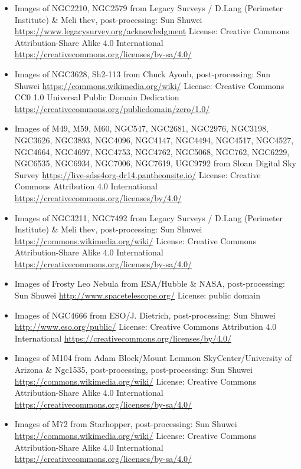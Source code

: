 \begin{itemize}
	 \url{http://eso.org/public/}
	 License: Creative Commons Attribution 4.0 International \url{https://creativecommons.org/licenses/by/4.0/}
\item Images of NGC2210, NGC2579
	 from Legacy Surveys / D.Lang (Perimeter Institute) \& Meli thev, post-processing: Sun Shuwei
	 \url{https://www.legacysurvey.org/acknowledgment}
	 License: Creative Commons Attribution-Share Alike 4.0 International \url{https://creativecommons.org/licenses/by-sa/4.0/}
\item Images of NGC3628, Sh2-113
	 from Chuck Ayoub, post-processing: Sun Shuwei
	 \url{https://commons.wikimedia.org/wiki/}
	 License: Creative Commons CC0 1.0 Universal Public Domain Dedication \url{https://creativecommons.org/publicdomain/zero/1.0/}
\item Images of M49, M59, M60, NGC547, NGC2681, NGC2976, NGC3198, NGC3626, NGC3893,
	 NGC4096, NGC4147, NGC4494, NGC4517, NGC4527, NGC4664, NGC4697, NGC4753,
	 NGC4762, NGC5068, NGC762, NGC6229, NGC6535, NGC6934, NGC7006, NGC7619,
	 UGC9792
	 from Sloan Digital Sky Survey
	 \url{https://live-sdss4org-dr14.pantheonsite.io/}
	 License: Creative Commons Attribution 4.0 International \url{https://creativecommons.org/licenses/by/4.0/} 
\item Images of NGC3211, NGC7492
	 from Legacy Surveys / D.Lang (Perimeter Institute) \& Meli thev, post-processing: Sun Shuwei
	 \url{https://commons.wikimedia.org/wiki/}
	 License: Creative Commons Attribution-Share Alike 4.0 International \url{https://creativecommons.org/licenses/by-sa/4.0/}
\item Images of Frosty Leo Nebula
	 from ESA/Hubble \& NASA, post-processing: Sun Shuwei
	 \url{http://www.spacetelescope.org/}
	 License: public domain
\item Images of NGC4666
	 from ESO/J. Dietrich, post-processing: Sun Shuwei
	 \url{http://www.eso.org/public/}
	 License: Creative Commons Attribution 4.0 International \url{https://creativecommons.org/licenses/by/4.0/}
\item Images of M104
	 from Adam Block/Mount Lemmon SkyCenter/University of Arizona \& Ngc1535, post-processing, post-processing: Sun Shuwei
	 \url{https://commons.wikimedia.org/wiki/}
	 License: Creative Commons Attribution-Share Alike 4.0 International \url{https://creativecommons.org/licenses/by-sa/4.0/}
\item Images of M72
	 from Starhopper, post-processing: Sun Shuwei
	 \url{https://commons.wikimedia.org/wiki/}
	 License: Creative Commons Attribution-Share Alike 4.0 International \url{https://creativecommons.org/licenses/by-sa/4.0/}

\end{itemize}
